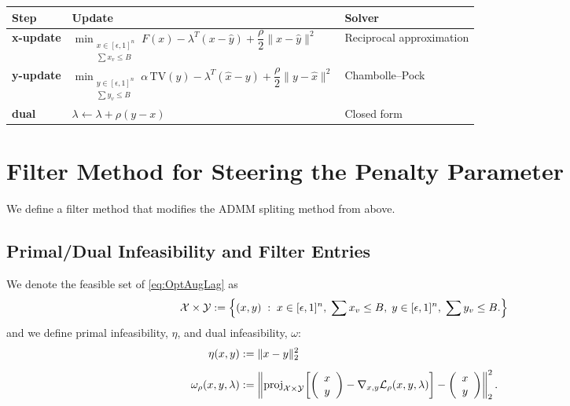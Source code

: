 \documentclass[11pt]{article}
\newcommand{\proj}{\operatorname{proj}}
\newcommand{\TV}{\mathrm{TV}}
\newcommand{\myvec}[1]{\left(\begin{array}{c} #1 \end{array}\right)}
\begin{document}
\medskip
\begin{center}
\begin{tabular}{@{}lll@{}}
\toprule
\textbf{Step} & \textbf{Update} & \textbf{Solver} \\
\midrule
\textbf{x-update} &
  $\displaystyle\min_{\substack{x\in[\epsilon,1]^n \\ \sum x_v \leq B}}
    F(x) - \lambda^T \left( x - \hat{y} \right) + \dfrac{\rho}{2}\|x - \hat{y}\|^2$ &
  Reciprocal approximation \\[14pt]
\textbf{y-update} &
  $\displaystyle\min_{\substack{y\in[\epsilon,1]^n \\ \sum y_v \leq B}}
    \alpha\,\TV(y) - \lambda^T \left( \hat{x} - y \right) + \dfrac{\rho}{2}\|y - \hat{x}\|^2$ &
  Chambolle--Pock \\[14pt]
\textbf{dual} &
  $\lambda \leftarrow \lambda + \rho(y - x)$ &
  Closed form \\
\bottomrule
\end{tabular}
\end{center}

\section{Filter Method for Steering the Penalty Parameter}

We define a filter method that modifies the ADMM spliting method from above.

\subsection{Primal/Dual Infeasibility and Filter Entries}

We denote the feasible set of \eqref{eq:OptAugLag} as
\begin{equation}
  {\cal X} \times {\cal Y} := \left\{ (x,y) \; : \; x\in[\epsilon,1]^n,\; \sum x_v \leq B, \;
  y\in[\epsilon,1]^n,\; \sum y_v \leq B.\right\}
\end{equation}
and we define primal infeasibility, $\eta$, and dual infeasibility, $\omega$:
\begin{align}
  \eta(x,y) &:= \|x-y\|_2^2 \label{eq:eta}\\[4pt]
  \omega_{\rho}(x,y,\lambda) &:= \left\|\proj_{\mathcal{X}\times{\cal Y}}\!\left[\myvec{x \\ y} - \nabla_{x,y} \mathcal{L}_\rho(x,y,\lambda)\right] - \myvec{x \\ y}\right\|_2^2. \label{eq:omega}
\end{align}
\end{document}

